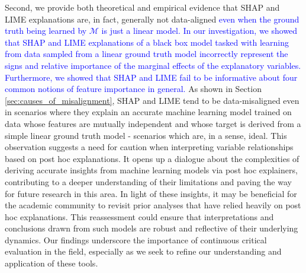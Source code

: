 \documentclass[mnsc,blindrev]{informs3}
\begin{document}
       Second, we provide both theoretical and empirical evidence that SHAP and LIME explanations are, in fact, generally not data-aligned \textcolor{blue}{even when the ground truth being learned by $\mathcal{M}$ is just a linear model. In our investigation, we showed that SHAP and LIME explanations of a black box model tasked with learning from data sampled from a linear ground truth model incorrectly represent the signs and relative importance of the marginal effects of the explanatory variables. Furthermore, we showed that SHAP and LIME fail to be informative about four common notions of feature importance in general.} As shown in Section \ref{sec:causes_of_misalignment}, SHAP and LIME tend to be data-misaligned even in scenarios where they explain an accurate machine learning model trained on data whose features are mutually independent and whose target is derived from a simple linear ground truth model - scenarios which are, in a sense, ideal. This observation suggests a need for caution when interpreting variable relationships based on post hoc explanations. It opens up a dialogue about the complexities of deriving accurate insights from machine learning models via post hoc explainers, contributing to a deeper understanding of their limitations and paving the way for future research in this area. In light of these insights, it may be beneficial for the academic community to revisit prior analyses that have relied heavily on post hoc explanations. This reassessment could ensure that interpretations and conclusions drawn from such models are robust and reflective of their underlying dynamics. Our findings underscore the importance of continuous critical evaluation in the field, especially as we seek to refine our understanding and application of these tools. 
        
\end{document}
